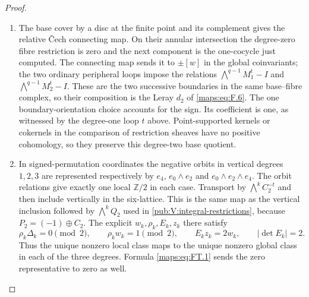 \begin{proof}
\begin{enumerate}[label={$\langle1\rangle$\arabic*.}]
\item The base cover by a disc at the finite point and its
complement gives the relative \v{C}ech connecting map.  On their
annular intersection the degree-zero fibre restriction is zero and
the next component is the one-cocycle just computed.
The connecting map sends it to $\pm[w]$ in the global coinvariants;
the two ordinary peripheral loops impose the relations
$\bigwedge^{q-1}M_1^t-I$ and $\bigwedge^{q-1}M_2^t-I$.
These are the two successive boundaries in the same base--fibre
complex, so their composition is the Leray $d_2$ of
\eqref{maps:eq:F.6}.  The one boundary-orientation choice accounts
for the sign.  Its coefficient is one, as witnessed by the
degree-one loop $t$ above.  Point-supported kernels or cokernels in
the comparison of restriction sheaves have no positive cohomology,
so they preserve this degree-two base quotient.

\item In signed-permutation coordinates the negative orbits in
vertical degrees $1,2,3$ are represented respectively by
$e_4$, $e_0\wedge e_2$ and $e_0\wedge e_2\wedge e_4$.
The orbit relations give exactly one local $\mathbb Z/2$ in each
case.  Transport by $\bigwedge^kC_2^{-t}$ and then include vertically
in the six-lattice.  This is the same map as the vertical inclusion
followed by $\bigwedge^kQ_2$ used in
\cref{pub:V:integral-restrictions}, because $P_2=(-1)\oplus C_2$.
The explicit $w_k,\rho_k,E_k,z_k$ there satisfy
\[
 \rho_k\Delta_k=0\pmod2,\qquad
 \rho_kw_k=1\pmod2,\qquad E_kz_k=2w_k,
 \qquad |\det E_k|=2.
\]
Thus the unique nonzero local class maps to the unique nonzero
global class in each of the three degrees.  Formula
\eqref{maps:eq:FT.1} sends the zero representative to zero as well.
\end{enumerate}
\end{proof}




